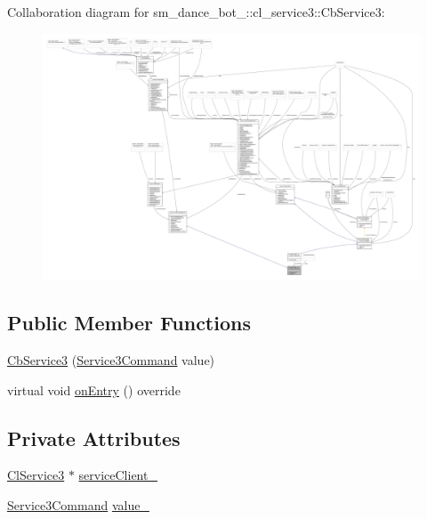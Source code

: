 Collaboration diagram for sm\+\_\+dance\+\_\+bot\+\_\+:\+:cl\+\_\+service3\+:\+:Cb\+Service3\+:
\nopagebreak
\begin{figure}[H]
\begin{center}
\leavevmode
\includegraphics[width=350pt]{classsm__dance__bot__3_1_1cl__service3_1_1CbService3__coll__graph}
\end{center}
\end{figure}
\subsection*{Public Member Functions}
\begin{DoxyCompactItemize}
\item 
\hyperlink{classsm__dance__bot__3_1_1cl__service3_1_1CbService3_a59167e7ee23b9202b64b50af7c0afc32}{Cb\+Service3} (\hyperlink{namespacesm__dance__bot__3_1_1cl__service3_a778128d056f05186ada82c9b0b210be5}{Service3\+Command} value)
\item 
virtual void \hyperlink{classsm__dance__bot__3_1_1cl__service3_1_1CbService3_a2843cf1c653e92eda5f0305c53e8ddc5}{on\+Entry} () override
\end{DoxyCompactItemize}
\subsection*{Private Attributes}
\begin{DoxyCompactItemize}
\item 
\hyperlink{classsm__dance__bot__3_1_1cl__service3_1_1ClService3}{Cl\+Service3} $\ast$ \hyperlink{classsm__dance__bot__3_1_1cl__service3_1_1CbService3_ac313fc2de53e56002597c3b6d6f1bd4e}{service\+Client\+\_\+}
\item 
\hyperlink{namespacesm__dance__bot__3_1_1cl__service3_a778128d056f05186ada82c9b0b210be5}{Service3\+Command} \hyperlink{classsm__dance__bot__3_1_1cl__service3_1_1CbService3_a91e0447ef3e49053ddfc3c01c2da715a}{value\+\_\+}
\end{DoxyCompactItemize}


